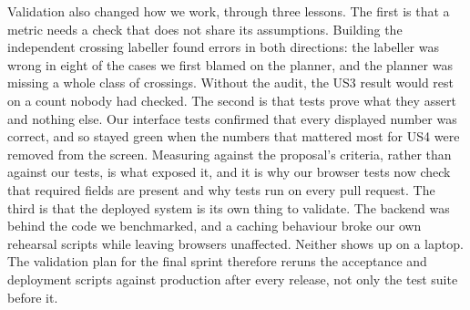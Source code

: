 Validation also changed how we work, through three lessons. The first is that a metric needs a check
that does not share its assumptions. Building the independent crossing
labeller found errors in both directions: the labeller was wrong in eight of
the cases we first blamed on the planner, and the planner was missing a whole
class of crossings. Without the audit, the US3 result would rest on a count
nobody had checked. The second is that tests prove what they assert and
nothing else. Our interface tests confirmed that every displayed number was
correct, and so stayed green when the numbers that mattered most for US4 were
removed from the screen. Measuring against the proposal's criteria, rather
than against our tests, is what exposed it, and it is why our browser tests now
check that required fields are present and why tests run on every pull request. The third
is that the deployed system is its own thing to validate. The backend was
behind the code we benchmarked, and a caching behaviour broke our own
rehearsal scripts while leaving browsers unaffected. Neither shows up on a
laptop. The validation plan for the final sprint therefore reruns the
acceptance and deployment scripts against production after every release,
not only the test suite before it.

